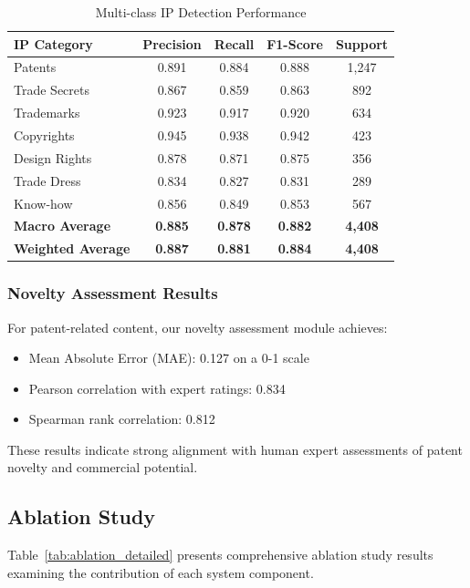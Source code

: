 \documentclass[11pt,a4paper]{article}
\begin{document}
\begin{table}[htbp]
\centering
\caption{Multi-class IP Detection Performance}
\label{tab:ip_multiclass}
\begin{tabular}{lcccc}
\toprule
\textbf{IP Category} & \textbf{Precision} & \textbf{Recall} & \textbf{F1-Score} & \textbf{Support} \\
\midrule
Patents & 0.891 & 0.884 & 0.888 & 1,247 \\
Trade Secrets & 0.867 & 0.859 & 0.863 & 892 \\
Trademarks & 0.923 & 0.917 & 0.920 & 634 \\
Copyrights & 0.945 & 0.938 & 0.942 & 423 \\
Design Rights & 0.878 & 0.871 & 0.875 & 356 \\
Trade Dress & 0.834 & 0.827 & 0.831 & 289 \\
Know-how & 0.856 & 0.849 & 0.853 & 567 \\
\midrule
\textbf{Macro Average} & \textbf{0.885} & \textbf{0.878} & \textbf{0.882} & \textbf{4,408} \\
\textbf{Weighted Average} & \textbf{0.887} & \textbf{0.881} & \textbf{0.884} & \textbf{4,408} \\
\bottomrule
\end{tabular}
\end{table}

\subsubsection{Novelty Assessment Results}

For patent-related content, our novelty assessment module achieves:
\begin{itemize}
  \item Mean Absolute Error (MAE): 0.127 on a 0-1 scale
  \item Pearson correlation with expert ratings: 0.834
  \item Spearman rank correlation: 0.812
\end{itemize}

These results indicate strong alignment with human expert assessments of patent novelty and commercial potential.

\subsection{Ablation Study}

Table~\ref{tab:ablation_detailed} presents comprehensive ablation study results examining the contribution of each system component.
\end{document}
